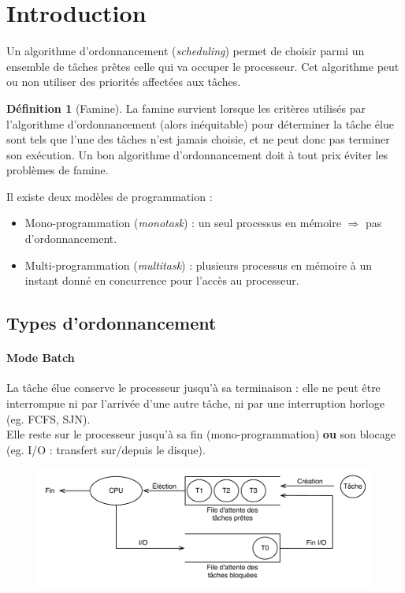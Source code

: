 \documentclass[11pt,english,french]{scrreprt}
\theoremstyle{remark}
\theoremstyle{definition}
\newtheorem*{def*}{Définition}
\begin{document}
\section{Introduction} %

Un algorithme d'ordonnancement (\emph{scheduling}) permet de choisir parmi un ensemble de tâches prêtes celle qui va occuper le processeur. Cet algorithme peut ou non utiliser des priorités affectées aux tâches.

\begin{def*}[Famine]
	La famine survient lorsque les critères utilisés par l'algorithme d'ordonnancement (alors inéquitable) pour déterminer la tâche élue sont tels que l'une des tâches n'est jamais choisie, et ne peut donc pas terminer son exécution. Un bon algorithme d'ordonnancement doit à tout prix éviter les problèmes de famine.
\end{def*}

Il existe deux modèles de programmation : \begin{itemize}
	\item Mono-programmation (\emph{monotask}) : un seul processus en mémoire $\Rightarrow$ pas d'ordonnancement.
	\item Multi-programmation (\emph{multitask}) : plusieurs processus en mémoire à un instant donné en concurrence pour l'accès au processeur.
\end{itemize}

\subsection{Types d'ordonnancement} %

\paragraph{Mode Batch} %
	La tâche élue conserve le processeur jusqu'à sa terminaison : elle ne peut être interrompue ni par l'arrivée d'une autre tâche, ni par une interruption horloge (eg. FCFS, SJN).\\
	Elle reste sur le processeur jusqu'à sa fin (mono-programmation) \textbf{ou} son blocage (eg. I/O : transfert sur/depuis le disque).
	\begin{figure}[h!]
		\center
		\includegraphics[scale=.75]{img/ordonnencement-batch}
	\end{figure}
\end{document}
